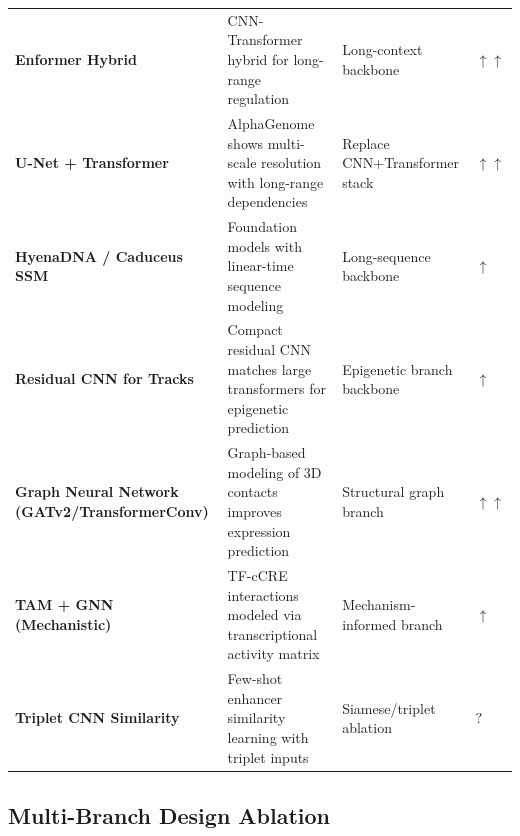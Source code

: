 \documentclass[11pt,a4paper]{article}
\begin{document}
\begin{longtable}{L{3.0cm}L{4.3cm}L{4.2cm}C{1.4cm}}
\textbf{Enformer Hybrid} & CNN-Transformer hybrid for long-range regulation~\cite{enformer} & Long-context backbone & \textcolor{positive}{$\uparrow\uparrow$} \\

\textbf{U-Net + Transformer} & AlphaGenome shows multi-scale resolution with long-range dependencies~\cite{alphagenome} & Replace CNN+Transformer stack & \textcolor{positive}{$\uparrow\uparrow$} \\

\textbf{HyenaDNA / Caduceus SSM} & Foundation models with linear-time sequence modeling~\cite{hyenadna,caduceus} & Long-sequence backbone & \textcolor{positive}{$\uparrow$} \\

\textbf{Residual CNN for Tracks} & Compact residual CNN matches large transformers for epigenetic prediction~\cite{epiexpr} & Epigenetic branch backbone & \textcolor{positive}{$\uparrow$} \\

\textbf{Graph Neural Network (GATv2/TransformerConv)} & Graph-based modeling of 3D contacts improves expression prediction~\cite{epiexpr} & Structural graph branch & \textcolor{positive}{$\uparrow\uparrow$} \\

\textbf{TAM + GNN (Mechanistic)} & TF-cCRE interactions modeled via transcriptional activity matrix~\cite{regx} & Mechanism-informed branch & \textcolor{positive}{$\uparrow$} \\

\textbf{Triplet CNN Similarity} & Few-shot enhancer similarity learning with triplet inputs~\cite{enhancermatcher} & Siamese/triplet ablation & \textcolor{uncertain}{$?$} \\

\end{longtable}

\subsection{Multi-Branch Design Ablation}
\end{document}
